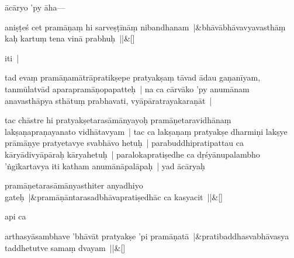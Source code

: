\documentclass[article,12pt,a4paper]{memoir}%
\newcommand{\persName}[1]{#1}
\newcounter{parCount}
\begin{document}
	  
	  

	  \pstart \leavevmode%
	\persName{ācāryo} 'py āha—
	{}
	\pend%
      
	    
	    \stanza[\smallbreak]
	  aniṣṭeś cet pramāṇaṃ hi sarveṣṭīnāṃ nibandhanam |&bhāvābhāvavyavasthāṃ kaḥ kartuṃ tena vinā prabhuḥ ||\&[\smallbreak]
	  
	  
	  

	  \pstart \leavevmode%
	iti |
	{}
	\pend%
      

	  \pstart \leavevmode%
	\label{thakur75-96.26}tad evaṃ pramāṇamātrāpratikṣepe pratyakṣaṃ tāvad ādau gaṇanīyam, tanmūlatvād aparapramāṇopapatteḥ | na ca cārvāko 'py anumānam anavasthāpya sthātuṃ prabhavati, vyāpāratrayakaraṇāt | 
	{}
	\pend%
      

	  \pstart \leavevmode%
	\label{thakur75-97.1}tac chāstre hi pratyakṣetarasāmānyayoḥ pramāṇetaravidhānaṃ lakṣaṇapraṇayanato vidhātavyam | tac ca lakṣaṇaṃ pratyakṣe dharmiṇi lakṣye prāmāṇye pratyetavye svabhāvo hetuḥ | parabuddhipratipattau ca kāryādivyāpāraḥ kāryahetuḥ | paralokapratiṣedhe ca dṛśyānupalambho 'ṅgīkartavya iti katham anumānāpalāpaḥ | yad ācāryaḥ 
	{}
	\pend%
      
	    
	    \stanza[\smallbreak]
	  pramāṇetarasāmānyasthiter anyadhiyo gateḥ |&pramāṇāntarasadbhāvapratiṣedhāc ca kasyacit ||\&[\smallbreak]
	  
	  
	  

	  \pstart \leavevmode%
	api ca
	{}
	\pend%
      
	    
	    \stanza[\smallbreak]
	  arthasyāsambhave 'bhāvāt pratyakṣe 'pi pramāṇatā |&pratibaddhasvabhāvasya taddhetutve samaṃ dvayam ||\&[\smallbreak]
	  
\end{document}
